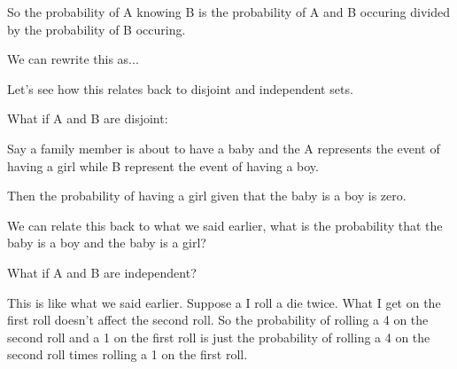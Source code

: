 \documentclass[slidestop,compress,mathserif,12pt,t,professionalfonts,xcolor=table]{beamer}
\begin{document}
\begin{frame}
{\begin{outline}
\2 So the probability of A knowing B is the probability of A and B occuring
divided by the probability of B occuring.

\1 We can rewrite this as...

\1 Let's see how this relates back to disjoint and independent sets.

\1 What if A and B are disjoint:

\2 Say a family member is about to have a baby and the A represents the event of
having a girl while B represent the event of having a boy.

\2 Then the probability of having a girl given that the baby is a boy is zero.

\2 We can relate this back to what we said earlier, what is the probability that
the baby is a boy and the baby is a girl?

\1 What if A and B are independent?

\1 This is like what we said earlier.  Suppose a I roll a die twice.  What I get
on the first roll doesn't affect the second roll.  So the probability of rolling
a 4 on the second roll and a 1 on the first roll is just the probability of
rolling a 4 on the second roll times rolling a 1 on the first roll.

\end{outline}

}

\end{frame}

\end{document}
